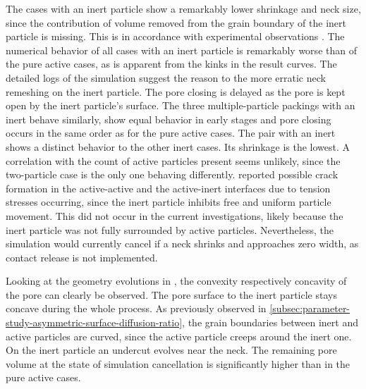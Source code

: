 The cases with an inert particle show a remarkably lower shrinkage and neck size, since the contribution of volume removed from the grain boundary of the inert particle is missing.
This is in accordance with experimental observations \cite{German2014}.
The numerical behavior of all cases with an inert particle is remarkably worse than of the pure active cases, as is apparent from the kinks in the result curves.
The detailed logs of the simulation suggest the reason to the more erratic neck remeshing on the inert particle.
The pore closing is delayed as the pore is kept open by the inert particle's surface.
The three multiple-particle packings with an inert behave similarly, show equal behavior in early stages and pore closing occurs in the same order as for the pure active cases.
The pair with an inert shows a distinct behavior to the other inert cases.
Its shrinkage is the lowest.
A correlation with the count of active particles present seems unlikely, since the two-particle case is the only one behaving differently.
\textcite{German2014} reported possible crack formation in the active-active and the active-inert interfaces due to tension stresses occurring, since the inert particle inhibits free and uniform particle movement.
This did not occur in the current investigations, likely because the inert particle was not fully surrounded by active particles.
Nevertheless, the simulation would currently cancel if a neck shrinks and approaches zero width, as contact release is not implemented.

Looking at the geometry evolutions in , the convexity respectively concavity of the pore can clearly be observed.
The pore surface to the inert particle stays concave during the whole process.
As previously observed in \cref{subsec:parameter-study-asymmetric-surface-diffusion-ratio}, the grain boundaries between inert and active particles are curved, since the active particle creeps around the inert one.
On the inert particle an undercut evolves near the neck.
The remaining pore volume at the state of simulation cancellation is significantly higher than in the pure active cases.
